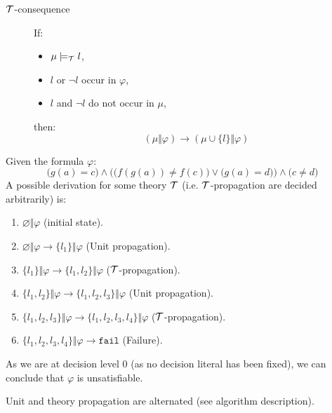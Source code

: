 \begin{description}
        \begin{description}
            \item[$\mathcal{T}$-consequence] 
                If:
                \begin{itemize}
                    \item $\mu \models_{\mathcal{T}} l$,
                    \item $l$ or $\lnot l$ occur in $\varphi$,
                    \item $l$ and $\lnot l$ do not occur in $\mu$, 
                \end{itemize}
                then:
                \[ (\mu \Vert \varphi) \rightarrow (\mu \cup \{ l \} \Vert \varphi) \]
        \end{description}

    \begin{example}
        Given the formula $\varphi$:
        \[ \big( g(a) = c \big) \land \Big( \big( f(g(a)) \neq f(c) \big) \vee \big( g(a) = d \big) \Big) \land \big( c \neq d \big) \]
        A possible derivation for some theory $\mathcal{T}$ (i.e. $\mathcal{T}$-propagation are decided arbitrarily) is:
        \begin{enumerate}
            \item $\varnothing \Vert \varphi$ (initial state).
            \item $\varnothing \Vert \varphi \rightarrow \{ l_1 \} \Vert \varphi$ (Unit propagation).
            \item $\{ l_1 \} \Vert \varphi \rightarrow \{ l_1, l_2 \} \Vert \varphi$ ($\mathcal{T}$-propagation).
            \item $\{ l_1, l_2 \} \Vert \varphi \rightarrow \{ l_1, l_2, l_3 \} \Vert \varphi$ (Unit propagation).
            \item $\{ l_1, l_2, l_3 \} \Vert \varphi \rightarrow \{ l_1, l_2, l_3, l_4 \} \Vert \varphi$ ($\mathcal{T}$-propagation).
            \item $\{ l_1, l_2, l_3, l_4 \} \Vert \varphi \rightarrow \texttt{fail}$ (Failure).
        \end{enumerate}
        As we are at decision level 0 (as no decision literal has been fixed), we can conclude that $\varphi$ is unsatisfiable.

        \indenttbox
        \begin{remark}
            Unit and theory propagation are alternated (see algorithm description).
        \end{remark}
    \end{example}


\end{description}
